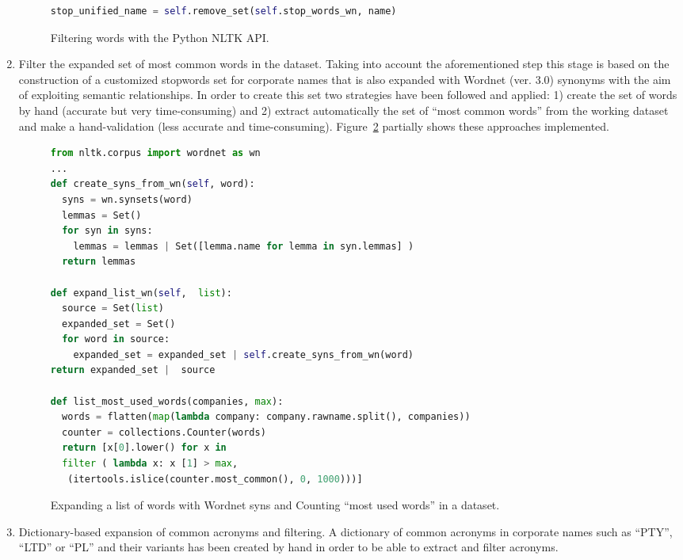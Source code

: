 \documentclass{llncs}
\begin{document}
\begin{enumerate}
\begin{figure}[!h]
\begin{center}
\begin{lstlisting}[language=Python]
stop_unified_name = self.remove_set(self.stop_words_wn, name)
\end{lstlisting}
\caption{Filtering words with the Python NLTK API.}
\label{figure:step-2}
\end{center}
\end{figure}

\item Filter the expanded set of most common words in the dataset. Taking into account 
the aforementioned step this stage is based on the construction of a customized stopwords 
set for corporate names that is also expanded with Wordnet (ver. 3.0) synonyms with the aim of 
exploiting semantic relationships. In order to create this set two strategies have been followed and applied: 1) create the set 
of words by hand (accurate but very time-consuming) and 2) extract automatically the set of ``most common words'' from the 
working dataset and make a hand-validation (less accurate and time-consuming). Figure~\ref{figure:step-3} partially 
shows these approaches implemented.
    
\begin{figure}[!h]
\begin{center}
\begin{lstlisting}[language=Python]  
from nltk.corpus import wordnet as wn
...
def create_syns_from_wn(self, word):
  syns = wn.synsets(word) 
  lemmas = Set()
  for syn in syns:
    lemmas = lemmas | Set([lemma.name for lemma in syn.lemmas] )
  return lemmas

def expand_list_wn(self,  list):    
  source = Set(list)
  expanded_set = Set()
  for word in source:
    expanded_set = expanded_set | self.create_syns_from_wn(word)
return expanded_set |  source

def list_most_used_words(companies, max):
  words = flatten(map(lambda company: company.rawname.split(), companies))
  counter = collections.Counter(words)  
  return [x[0].lower() for x in 
  filter ( lambda x: x [1] > max, 
   (itertools.islice(counter.most_common(), 0, 1000)))]
\end{lstlisting}
\caption{Expanding a list of words with Wordnet syns and Counting ``most used words'' in a dataset.}
\label{figure:step-3}
\end{center}
\end{figure}

\item Dictionary-based expansion of common acronyms and filtering. A dictionary of common acronyms in corporate 
names such as ``PTY'', ``LTD'' or ``PL'' and their variants has been created by hand in order 
to be able to extract and filter acronyms. 



\end{enumerate}
\end{document}
